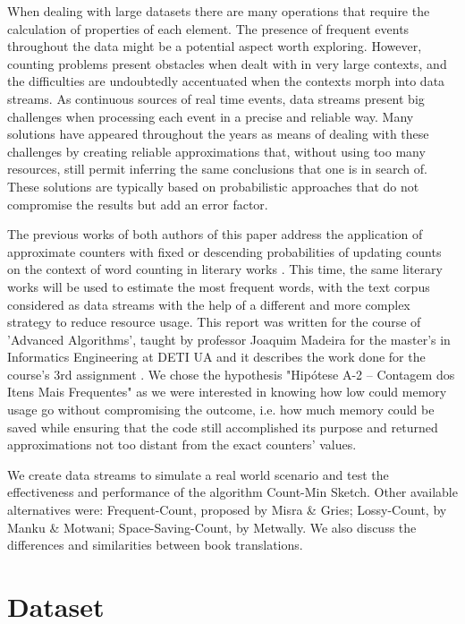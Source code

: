 \documentclass[shortpaper]{revdetua}
\begin{document}
When dealing with large datasets there are many operations that require the calculation of properties of each element. 
The presence of frequent events throughout the data might be a potential aspect worth exploring.
However, counting problems present obstacles when dealt with in very large contexts, and the difficulties are undoubtedly accentuated when the contexts morph 
into data streams.
As continuous sources of real time events, data streams present big challenges when processing each event in a precise and reliable way.
Many solutions have appeared throughout the years as means of dealing with these challenges by creating reliable approximations that, without using too many 
resources, still permit inferring the same conclusions that one is in search of.
These solutions are typically based on probabilistic approaches that do not compromise the results but add an error factor. 

The previous works of both authors of this paper address the application of approximate counters with fixed or descending probabilities of updating counts on 
the context of word counting in literary works \cite{alegria} \cite{filipe}.
This time, the same literary works will be used to estimate the most frequent words, with the text corpus considered as data streams with the help of a different 
and more complex strategy to reduce resource usage.
This report was written for the course of 'Advanced Algorithms', taught by professor Joaquim Madeira for the master's in Informatics Engineering at DETI UA and 
it describes the work done for the course's 3rd assignment \cite{trab3}. 
We chose the hypothesis "Hipótese A-2 – Contagem dos Itens Mais Frequentes" as we were interested in knowing how low could memory usage go without compromising
the outcome, i.e. how much memory could be saved while ensuring that the code still accomplished its purpose and returned approximations not too distant from 
the exact counters' values.

We create data streams to simulate a real world scenario and test the effectiveness and performance of the algorithm Count-Min Sketch.
Other available alternatives were: Frequent-Count, proposed by Misra \& Gries; Lossy-Count, by Manku \& Motwani; Space-Saving-Count, by Metwally.
We also discuss the differences and similarities between book translations.

\section{Dataset}\label{dataset} %
\end{document}
